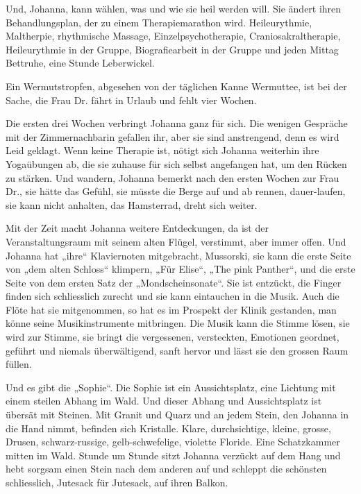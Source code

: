 \documentclass[10pt,titlepage,a5paper]{book}
\begin{document}
Und, Johanna, kann wählen, was und wie sie heil werden will. Sie ändert ihren Behandlungsplan, der zu einem Therapiemarathon wird. Heileurythmie, Maltherpie, rhythmische Massage, Einzelpsychotherapie, Craniosakraltherapie, Heileurythmie in der Gr\-uppe, Biografiearbeit in der Gruppe und jeden Mittag Bettruhe, eine Stunde Leberwickel.

Ein Wermutstropfen, abgesehen von der täglichen Kanne Wermuttee, ist bei der Sache, die Frau Dr. fährt in Urlaub und fehlt vier Wochen. 

Die ersten drei Wochen verbringt Johanna ganz für sich. Die wenigen Gespräche mit der Zimmernachbarin gefallen ihr, aber sie sind anstrengend, denn es wird Leid geklagt. Wenn keine Therapie ist, nötigt sich Johanna weiterhin ihre Yogaübungen ab, die sie zuhause für sich selbst angefangen hat, um den Rücken zu stärken. Und wandern, Johanna bemerkt nach den ersten Wochen zur Frau Dr., sie hätte das Gefühl, sie müsste die Berge auf und ab rennen, dauer-laufen, sie kann nicht anhalten, das Hamsterrad, dreht sich weiter.

Mit der Zeit macht Johanna weitere Entdeckungen, da ist der Veranstaltungsraum mit seinem alten Flügel, verstimmt, aber immer offen. Und Johanna hat „ihre“ Klaviernoten mitgebracht, Mussorski, sie kann die erste Seite von „dem alten Schloss“ klimpern, „Für Elise“, „The pink Panther“, und die erste Seite von dem ersten Satz der „Mondscheinsonate“. Sie ist entzückt, die Finger finden sich schliesslich zurecht und sie kann eintauchen in die Musik. Auch die Flöte hat sie mitgenommen, so hat es im Prospekt der Klinik gestanden, man könne seine Musikinstrumente mitbringen. Die Musik kann die Stimme lösen, sie wird zur Stimme, sie bringt die vergessenen, versteckten, Emotionen geordnet, geführt und niemals überwältigend, sanft hervor und lässt sie den grossen Raum füllen.

Und es gibt die „Sophie“. Die Sophie ist ein Aussichtsplatz, eine Lichtung mit einem steilen Abhang im Wald. Und dieser Abhang und Aussichtsplatz ist übersät mit Steinen. Mit Granit und Quarz und an jedem Stein, den Johanna in die Hand nimmt, befinden sich Kristalle. Klare, durchsichtige, kleine, grosse, Drusen, schwarz-russige, gelb-schwefelige, violette Floride. Eine Schatzkammer mitten im Wald. Stunde um Stunde sitzt Johanna verzückt auf dem Hang und hebt sorgsam einen Stein nach dem anderen auf und schleppt die schönsten schliesslich, Jutesack für Jutesack, auf ihren Balkon.
\end{document}
